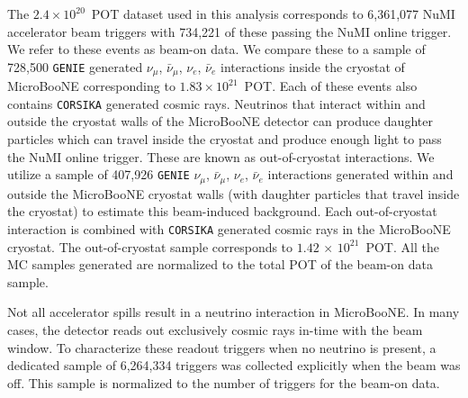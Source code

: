 \documentclass[%
 reprint,
 twocolumn,
superscriptaddress,
showpacs,preprintnumbers,
 amsmath,amssymb,
 aps,
prd,
longbibliography
]{revtex4-1}
\begin{document}
The $2.4\!\times\!10^{20}$~POT dataset used in this analysis %
 corresponds to 6,361,077 NuMI accelerator beam triggers with 734,221 of these passing the NuMI online trigger. We refer to these events as beam-on data.
We compare these to a sample of 728,500 %
\texttt{GENIE} generated $\nu_\mu$, $\bar{\nu}_\mu$, $\nu_e$, $\bar{\nu}_e$ interactions inside the cryostat of MicroBooNE corresponding to $1.83\!\times\!10^{21}$~POT.
Each of these events also contains \texttt{CORSIKA} generated cosmic rays.
Neutrinos that interact within and outside the cryostat walls of the MicroBooNE detector can produce daughter particles which can travel inside the cryostat and produce enough light to pass the NuMI online trigger. These are known as out-of-cryostat interactions. We utilize a sample of 407,926 \texttt{GENIE}  $\nu_\mu$, $\bar{\nu}_\mu$, $\nu_e$, $\bar{\nu}_e$ interactions generated within and outside the MicroBooNE cryostat walls (with daughter particles that travel inside the cryostat) to estimate this beam-induced background. Each out-of-cryostat interaction is combined with \texttt{CORSIKA} generated cosmic rays in the MicroBooNE cryostat. The out-of-cryostat sample corresponds to $1.42\!\,\times\!\,10^{21}$~POT. All the MC samples generated are normalized to the total POT of the beam-on data sample. 

Not all accelerator spills result in a neutrino interaction in MicroBooNE. In many cases, the detector reads out exclusively cosmic rays in-time with the beam window. To characterize these readout triggers when no neutrino is present, a dedicated sample of 6,264,334 triggers was collected explicitly when the beam was off. This sample is normalized to the number of triggers for the beam-on data.

\end{document}
